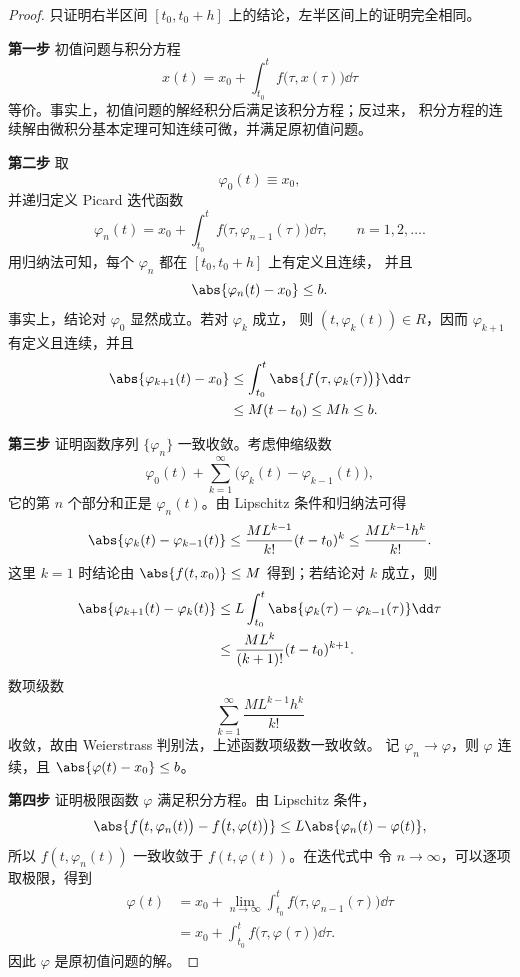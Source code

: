 \begin{proof}
	只证明右半区间 $[t_0,t_0+h]$ 上的结论，左半区间上的证明完全相同。

	\noindent\textbf{第一步}\quad
	初值问题与积分方程
	\[
		x(t)=x_0+\int_{t_0}^{t}f\bigl(\tau,x(\tau)\bigr)\dd\tau
	\]
	等价。事实上，初值问题的解经积分后满足该积分方程；反过来，
	积分方程的连续解由微积分基本定理可知连续可微，并满足原初值问题。

	\noindent\textbf{第二步}\quad
	取
	\[
		\varphi_0(t)\equiv x_0,
	\]
	并递归定义 Picard 迭代函数
	\[
		\varphi_n(t)
		=x_0+\int_{t_0}^{t}
		f\bigl(\tau,\varphi_{n-1}(\tau)\bigr)\dd\tau,
		\qquad n=1,2,\ldots.
	\]
	用归纳法可知，每个 $\varphi_n$ 都在 $[t_0,t_0+h]$ 上有定义且连续，
	并且
	\[
		\abs{\varphi_n(t)-x_0}\leq b.
	\]
	事实上，结论对 $\varphi_0$ 显然成立。若对 $\varphi_k$ 成立，
	则 $(t,\varphi_k(t))\in R$，因而 $\varphi_{k+1}$ 有定义且连续，并且
	\[
		\begin{aligned}
			\abs{\varphi_{k+1}(t)-x_0}
			&\leq\int_{t_0}^{t}
			\abs{f\bigl(\tau,\varphi_k(\tau)\bigr)}\dd\tau\\
			&\leq M(t-t_0)
			\leq Mh
			\leq b.
		\end{aligned}
	\]

	\noindent\textbf{第三步}\quad
	证明函数序列 $\{\varphi_n\}$ 一致收敛。考虑伸缩级数
	\[
		\varphi_0(t)
		+\sum_{k=1}^{\infty}
		\bigl(\varphi_k(t)-\varphi_{k-1}(t)\bigr),
	\]
	它的第 $n$ 个部分和正是 $\varphi_n(t)$。由 Lipschitz 条件和归纳法可得
	\[
		\abs{\varphi_k(t)-\varphi_{k-1}(t)}
		\leq
		\dfrac{ML^{k-1}}{k!}(t-t_0)^k
		\leq
		\dfrac{ML^{k-1}h^k}{k!}.
	\]
	这里 $k=1$ 时结论由 $\abs{f(t,x_0)}\leq M$ 得到；若结论对 $k$
	成立，则
	\[
		\begin{aligned}
			\abs{\varphi_{k+1}(t)-\varphi_k(t)}
			&\leq L\int_{t_0}^{t}
			\abs{\varphi_k(\tau)-\varphi_{k-1}(\tau)}\dd\tau\\
			&\leq
			\dfrac{ML^k}{(k+1)!}(t-t_0)^{k+1}.
		\end{aligned}
	\]
	数项级数
	\[
		\sum_{k=1}^{\infty}\dfrac{ML^{k-1}h^k}{k!}
	\]
	收敛，故由 Weierstrass 判别法，上述函数项级数一致收敛。
	记 $\varphi_n\to\varphi$，则 $\varphi$ 连续，且
	$\abs{\varphi(t)-x_0}\leq b$。

	\noindent\textbf{第四步}\quad
	证明极限函数 $\varphi$ 满足积分方程。由 Lipschitz 条件，
	\[
		\abs{
			f\bigl(t,\varphi_n(t)\bigr)
			-f\bigl(t,\varphi(t)\bigr)
		}
		\leq L\abs{\varphi_n(t)-\varphi(t)},
	\]
	所以 $f(t,\varphi_n(t))$ 一致收敛于 $f(t,\varphi(t))$。在迭代式中
	令 $n\to\infty$，可以逐项取极限，得到
	\[
		\begin{aligned}
			\varphi(t)
			&=x_0+\lim_{n\to\infty}
			\int_{t_0}^{t}
			f\bigl(\tau,\varphi_{n-1}(\tau)\bigr)\dd\tau\\
			&=x_0+\int_{t_0}^{t}
			f\bigl(\tau,\varphi(\tau)\bigr)\dd\tau.
		\end{aligned}
	\]
	因此 $\varphi$ 是原初值问题的解。


\end{proof}
